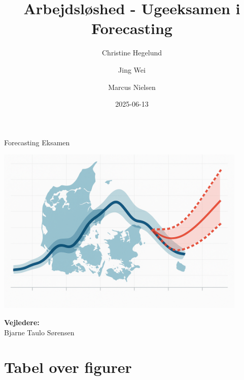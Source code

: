 \documentclass[
]{article}
\title{Arbejdsløshed - Ugeeksamen i Forecasting}
\author{Christine Hegelund \and Jing Wei \and Marcus Nielsen}
\date{2025-06-13}
\begin{document}
\maketitle


\maketitle
\thispagestyle{empty}
\begin{center}
\large{Forecasting Eksamen} \\[3em]
\end{center}
\begin{center}
\includegraphics[width=0.9\textwidth]{fotos/forside.png} \\[2em]
\end{center}
\begin{center}
\end{center}
\begin{center}
\textbf{Vejledere:} \\
Bjarne Taulo Sørensen \\
\end{center}

\newpage

\tableofcontents

\section*{Tabel over figurer}\label{tabel-over-figurer}

\thispagestyle{empty}

\newpage

\setcounter{page}{1}
\tableofcontents
\newpage
\end{document}
